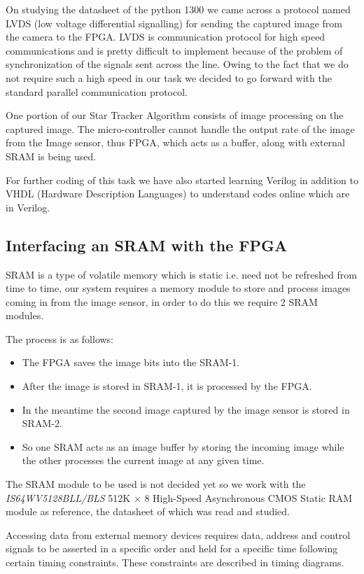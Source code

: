 \documentclass[../../main.tex]{subfiles}
\begin{document}
On studying the datasheet of the python 1300 we came across a protocol named LVDS (low voltage differential signalling) for sending the captured image from the camera to the FPGA. LVDS is communication protocol for high speed communications and is pretty difficult to implement because of the problem of synchronization of the signals sent across the line. Owing to the fact that we do not require such a high speed in our task we decided to go forward with the standard parallel communication protocol.

One portion of our Star Tracker Algorithm consists of image processing on the captured image.  The micro-controller cannot handle the output rate of the image from the Image sensor, thus FPGA, which acts as a buffer, along with external SRAM is being used. %

For further coding of this task we have also started learning Verilog in addition to VHDL (Hardware Description Languages) to understand codes online which are in Verilog.

\subsection{Interfacing an SRAM with the FPGA}
SRAM is a type of volatile memory which is static i.e. need not be refreshed from time to time, our system requires a memory module to store and process images coming in from the image sensor, in order to do this we require 2 SRAM modules.

The process is as follows:
\begin{itemize}
    \item The FPGA saves the image bits into the SRAM-1.
    \item After the image is stored in SRAM-1, it is processed by the FPGA.
    \item In the meantime the second image captured by the image sensor is stored in SRAM-2.
    \item So one SRAM acts as an image buffer by storing the incoming image while the other processes the current image at any given time.
\end{itemize}

The SRAM module to be used is not decided yet so we work with the \textit{IS64WV5128BLL/BLS} 512K \(\times\) 8 High-Speed Asynchronous CMOS Static RAM module as reference, the datasheet of which was read and studied.

Accessing data from external memory devices requires data, address and control signals to be asserted in a specific order and held for a specific time following certain timing constraints. These constraints are described in timing diagrams.
\end{document}
